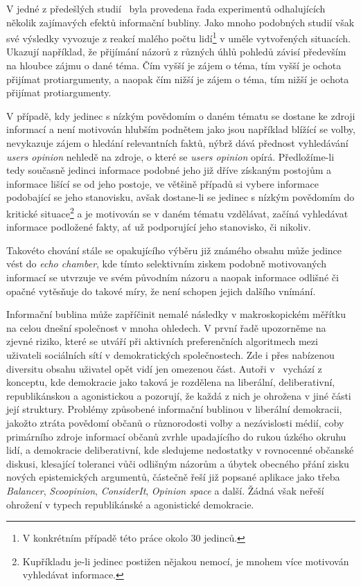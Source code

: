 \documentclass[12pt, a4paper]{article}
\numberwithin{equation}{section} 	%
\begin{document}
V jedné z předešlých studií~\cite{BeyondFilterBubble} byla provedena řada experimentů odhalujících několik zajímavých efektů informační bubliny. Jako mnoho podobných studií však své výsledky vyvozuje z reakcí malého počtu lidí\footnote{V konkrétním případě této práce okolo 30 jedinců.} v uměle vytvořených situacích. Ukazují například, že přijímání názorů z různých úhlů pohledů závisí především na hloubce zájmu o dané téma. Čím vyšší je zájem o téma, tím vyšší je ochota přijímat protiargumenty, a naopak čím nižší je zájem o téma, tím nižší je ochota přijímat protiargumenty.

V případě, kdy jedinec s nízkým povědomím o daném tématu se dostane ke zdroji informací a není motivován hlubším podnětem jako jsou například blížící se volby, nevykazuje zájem o hledání relevantních faktů, nýbrž dává přednost vyhledávání \textit{users opinion} nehledě na zdroje, o které se \textit{users opinion} opírá. Předložíme-li tedy současně jedinci informace podobné jeho již dříve získaným postojům a informace lišící se od jeho postoje, ve většině případů si vybere informace podobající se jeho stanovisku, avšak dostane-li se jedinec s nízkým povědomím do kritické situace\footnote{Kupříkladu je-li jedinec postižen nějakou nemocí, je mnohem více motivován vyhledávat informace.} a je motivován se v daném tématu vzdělávat, začíná vyhledávat informace podložené fakty, ať už podporující jeho stanovisko, či nikoliv.

Takovéto chování stále se opakujícího výběru již známého obsahu může jedince vést do \textit{echo chamber}, kde tímto selektivním ziskem podobně motivovaných informací se utvrzuje ve svém původním názoru a naopak informace odlišné či opačné vytěsňuje do takové míry, že není schopen jejich dalšího vnímání.

Informační bublina může zapříčinit nemalé následky v makroskopickém mě\-ří\-tku na celou dnešní společnost v mnoha ohledech. V první řadě upozorněme na zjevné riziko, které se utváří při aktivních preferenčních algoritmech mezi uživateli sociálních sítí v demokratických společnostech. Zde i přes nabízenou diversitu obsahu uživatel opět vidí jen omezenou část. Autoři v~\cite{BreakingTheFilterBubble} vychází z konceptu, kde demokracie jako taková je rozdělena na liberální, deliberativní, republikánskou a agonistickou a pozorují, že každá z nich je ohrožena v jiné části její struktury. Problémy způsobené informační bublinou v liberální demokracii, jakožto ztráta povědomí občanů o různorodosti volby a nezávislosti médií, coby primárního zdroje informací občanů zvrhle upadajícího do rukou úzkého okruhu lidí, a demokracie deliberativní, kde sledujeme nedostatky v rovnocenné občanské diskusi, klesající toleranci vůči odlišným názorům a úbytek obecného přání zisku nových epistemických argumentů, částečně řeší již popsané aplikace jako třeba \textit{Balancer}, \textit{Scoopinion}, \textit{ConsiderIt}, \textit{Opinion space} a další. Žádná však neřeší ohrožení v typech republikánské a agonistické demokracie.
\end{document}
